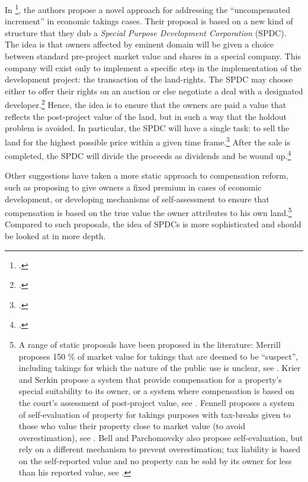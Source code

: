 \documentclass[12pt,a4paper]{book} %
\begin{document}
In \footcite{lehavi07}, the authors propose a novel approach for addressing the ``uncompensated increment'' in economic takings cases. Their proposal is based on a new kind of structure that they dub a {\it Special Purpose Development Corporation} (SPDC). The idea is that owners affected by eminent domain will be given a choice between standard pre-project market value and shares in a special company. This company will exist only to implement a specific step in the implementation of the development project: the transaction of the land-rights. The SPDC may choose either to offer their rights on an auction or else negotiate a deal with a designated developer.\footcite[1735]{lehavi07} Hence, the idea is to ensure that the owners are paid a value that reflects the post-project value of the land, but in such a way that the holdout problem is avoided. In particular, the SPDC will have a single task: to sell the land for the highest possible price within a given time frame.\footcite[1741]{lehavi07} After the sale is completed, the SPDC will divide the proceeds as dividends and be wound up.\footcite[1741]{lehavi07}

Other suggestions have taken a more static approach to compensation reform, such as proposing to give owners a fixed premium in cases of economic development, or developing mechanisms of self-assessment to ensure that compensation is based on the true value the owner attributes to his own land.\footnote{A range of static proposals have been proposed in the literature: Merrill proposes 150 \% of market value for takings that are deemed to be ``suspect'', including takings for which the nature of the public use is unclear, see \cite[90-93]{merrill86}. Krier and Serkin propose a system that provide compensation for a property's special suitability to its owner, or a system where compensation is based on the court's assessment of post-project value, see \cite[865-873]{krier04}. Fennell proposes a system of self-evaluation of property for takings purposes with tax-breaks given to those who value their property close to market value (to avoid overestimation), see \cite[995-996]{fennell04}. Bell and Parchomovsky also propose self-evaluation, but rely on a different mechanism to prevent overestimation; tax liability is based on the self-reported value and no property can be sold by its owner for less than his reported value, see \cite[890-900]{bell07}.} Compared to such proposals, the idea of SPDCs is more sophisticated and should be looked at in more depth. 
\end{document}
